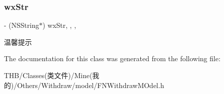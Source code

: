 \subsubsection{\texorpdfstring{wx\+Str}{wxStr}}
{\footnotesize\ttfamily -\/ (N\+S\+String$\ast$) wx\+Str\hspace{0.3cm}{\ttfamily [read]}, {\ttfamily [write]}, {\ttfamily [nonatomic]}, {\ttfamily [copy]}}

温馨提示 

The documentation for this class was generated from the following file\+:\begin{DoxyCompactItemize}
\item 
T\+H\+B/\+Classes(类文件)/\+Mine(我的)/\+Others/\+Withdraw/model/F\+N\+Withdraw\+M\+Odel.\+h\end{DoxyCompactItemize}
